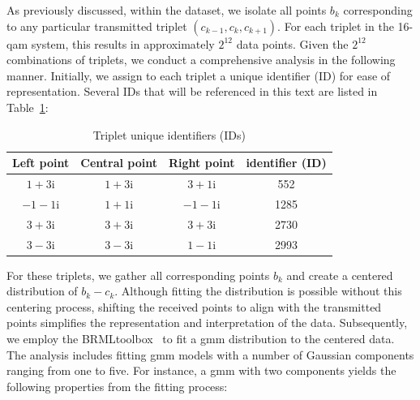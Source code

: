 As previously discussed, within the dataset, we isolate all points \( b_k \) corresponding to any particular transmitted triplet \( (c_{k-1}, c_k, c_{k+1}) \). For each triplet in the 16-\Gls{qam} system, this results in approximately \( 2^{12} \) data points. Given the \( 2^{12} \) combinations of triplets, we conduct a comprehensive analysis in the following manner. Initially, we assign to each triplet a unique identifier (ID) for ease of representation. Several IDs that will be referenced in this text are listed in Table~\ref{tab:triplet_ids}:
\begin{table}[h]
    \caption{Triplet unique identifiers (IDs)}
    \begin{center}
        \begin{tabular}{cccc}
            \hline
            Left point & Central point & Right point & identifier (ID)\\ 
            \hline
            $1+3\mathrm{i}$ & $1+3\mathrm{i}$ & $3+1\mathrm{i}$ & 552 \\ %
            $-1-1\mathrm{i}$ & $1+1\mathrm{i}$ & $-1-1\mathrm{i}$ & 1285 \\ %
            $3+3\mathrm{i}$ & $3+3\mathrm{i}$ & $3+3\mathrm{i}$ & 2730 \\ %
            $3-3\mathrm{i}$ & $3-3\mathrm{i}$ & $1-1\mathrm{i}$ & 2993 \\ %
            \hline
        \end{tabular}
    \label{tab:triplet_ids}
    \end{center}
\end{table} %
For these triplets, we gather all corresponding points \( b_k \) and create a centered distribution of \( b_k - c_k \). Although fitting the distribution is possible without this centering process, shifting the received points to align with the transmitted points simplifies the representation and interpretation of the data. Subsequently, we employ the BRMLtoolbox~\cite{barberBRML2012} to fit a \gls{gmm} distribution to the centered data. The analysis includes fitting \gls{gmm} models with a number of Gaussian components ranging from one to five. For instance, a \gls{gmm} with two components yields the following properties from the fitting process:
